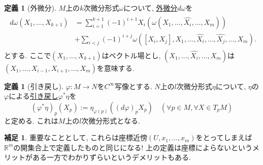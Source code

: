 \documentclass[dvipdfmx,a4paper,11pt]{article}
\newcommand{\R}{\mathbb{R}}
\theoremstyle{definition}
\newtheorem{dfn}[thm]{定義}
\newtheorem{rem}[thm]{補足}
\begin{document}
  \begin{tcolorbox}[
    colback = white,
    colframe = green!35!black,
    fonttitle = \bfseries,
    breakable = true]
\begin{dfn}[外微分]
$M$上の$k$次微分形式$\omega$について, \underline{外微分$d \omega$}を
\begin{align*}
\begin{split}
d\omega(X_1, \ldots, X_{k+1})
&=
\sum_{i=1}^{k+1}(-1)^{i+1}X_i(\omega(X_1, \ldots,\widehat{X_{i}}, \ldots, X_{m}))\\
&+\sum_{i<j}(-1)^{i+j}\omega([X_i, X_j], X_1, \ldots, \widehat{X_{i}},  \ldots, \widehat{X_{j}}, \ldots, X_{m}).
\end{split}
\end{align*}
とする.  ここで$(X_1, \ldots, X_{k+1})$はベクトル場とし, $(X_1, \ldots,\widehat{X_{i}}, \ldots, X_{m})$は$(X_1, \ldots,X_{i-1}, X_{i+1}, \ldots, X_{m})$を意味する.

    \end{dfn}
    \end{tcolorbox}
      \begin{tcolorbox}[
    colback = white,
    colframe = green!35!black,
    fonttitle = \bfseries,
    breakable = true]
\begin{dfn}[引き戻し]

 $\varphi : M \rightarrow N$を$C^{\infty}$写像とする. $N$上の$l$次微分形式$\eta$について, $\eta$の$\varphi$による\underline{引き戻し$\varphi^{*}\eta$}を
$$
(\varphi^{*}\eta)_{p}(X_{p}) := \eta_{\varphi(p)}((d\varphi)_{p} X_{p}) \quad (\forall p \in M, \forall X \in T_{p}M)
$$
と定める. これは$M$上の$l$次微分形式となる. 
    \end{dfn}
    \end{tcolorbox}
    
    \begin{rem}
    重要なこととして, これらは座標近傍$(U, x_1, \ldots, x_m)$をとってしまえば$\R^m$の開集合上で定義したものと同じになる! 上の定義は座標によらないというメリットがある一方でわかりずらいというデメリットもある. 
    \end{rem}
    


\end{document}
